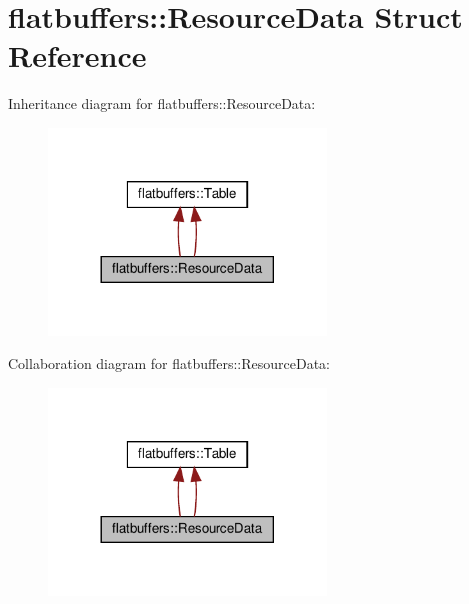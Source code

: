 \hypertarget{structflatbuffers_1_1ResourceData}{}\section{flatbuffers\+:\+:Resource\+Data Struct Reference}
\label{structflatbuffers_1_1ResourceData}


Inheritance diagram for flatbuffers\+:\+:Resource\+Data\+:
\nopagebreak
\begin{figure}[H]
\begin{center}
\leavevmode
\includegraphics[width=209pt]{structflatbuffers_1_1ResourceData__inherit__graph}
\end{center}
\end{figure}


Collaboration diagram for flatbuffers\+:\+:Resource\+Data\+:
\nopagebreak
\begin{figure}[H]
\begin{center}
\leavevmode
\includegraphics[width=209pt]{structflatbuffers_1_1ResourceData__coll__graph}
\end{center}
\end{figure}
